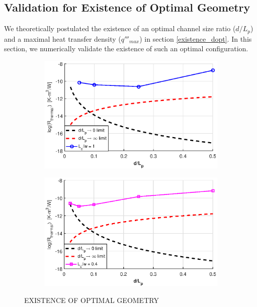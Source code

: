 \documentclass[twocolumn,10pt,cleanfoot]{ihmtc}
\begin{document}
\subsection{Validation for Existence of Optimal Geometry}\label{optgeo}
We theoretically postulated the existence of an optimal channel size ratio ($d/L_p$) and a maximal heat transfer density ($q'''_{max}$) in section \ref{existence_dopt}. In this section, we numerically validate the existence of such an optimal configuration. 
%
\begin{figure}
\centering
   \begin{subfigure}[b]{0.55\textwidth}
   \includegraphics[width=0.85\linewidth]{Rmin_a.eps}
   \caption{}
   \label{Rmin_a} 
\end{subfigure}
%
   \begin{subfigure}[b]{0.55\textwidth}
   \includegraphics[width=0.85\linewidth]{Rmin_b.eps}
   \caption{}
   \label{Rmin_b} 
\end{subfigure}
%
%
%
\vspace{-2.5em}
\caption{EXISTENCE OF OPTIMAL GEOMETRY}
\vspace{-3.5em}
\end{figure}
\end{document}

